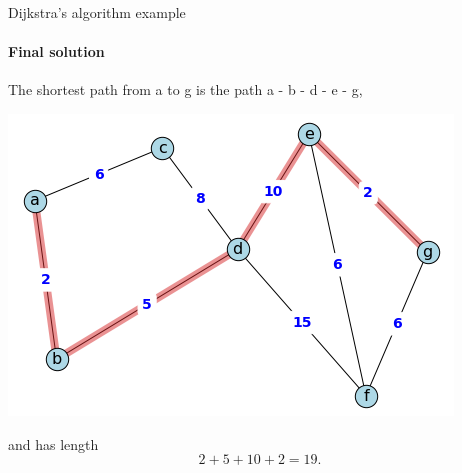 \begin{example}{Dijkstra's algorithm example}{}
\paragraph{Final solution} 
The shortest path from a to g is the path a - b - d - e - g, 
\begin{center}
\includegraphics[scale = 0.5]{graph-theory-graphics/dijkstra-soln.png}
\end{center} 
and has length 
$$
2 + 5 + 10 + 2 = 19.
$$
\end{example}

\newpage
\newpage



